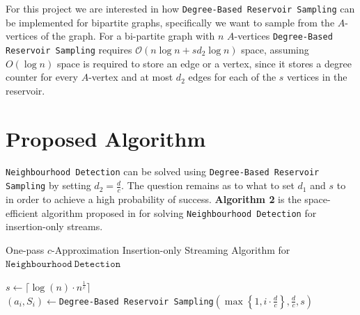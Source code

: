 \documentclass[11pt,twoside,a4paper]{report}
\begin{document}
\par For this project we are interested in how \texttt{Degree-Based Reservoir Sampling} can be implemented for bipartite graphs, specifically we want to sample from the $A$-vertices of the graph. For a bi-partite graph with $n$ $A$-vertices \texttt{Degree-Based Reservoir Sampling} requires $\mathcal{O}(n\log n+sd_2\log n)$ space, assuming $O(\log n)$ space is required to store an edge or a vertex, since it stores a degree counter for every $A$-vertex and at most $d_2$ edges for each of the $s$ vertices in the reservoir.

\section{Proposed Algorithm}


\texttt{Neighbourhood Detection} can be solved using \texttt{Degree-Based Reservoir Sampling} by setting $d_2=\frac{d}c$. The question remains as to what to set $d_1$ and $s$ to in order to achieve a high probability of success. \textbf{Algorithm 2} is the space-efficient algorithm proposed in \cite{orig} for solving \texttt{Neighbourhood Detection} for insertion-only streams.

\begin{algorithm}
	\caption{One-pass $c$-Approximation Insertion-only Streaming Algorithm for $\mathtt{Neighbourhood\ Detection}$}
	$s\leftarrow\lceil\log(n)\cdot n^{\frac1c}\rceil$\\
	 {
		$(a_i,S_i)\leftarrow$\texttt{Degree-Based Reservoir Sampling}$\left(\max\left\{1,i\cdot\frac{d}{c}\right\},\frac{d}c,s\right)$
	}
\end{algorithm}
\end{document}
